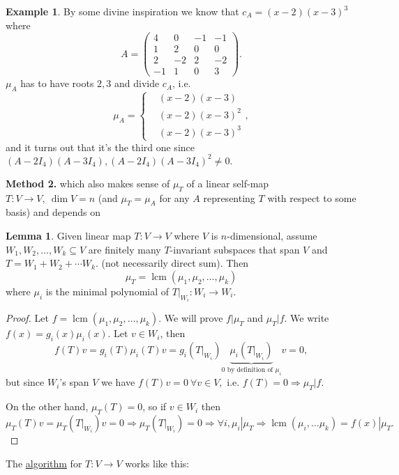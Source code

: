 \documentclass[a4paper]{article}
\newcommand{\lcm}{\operatorname{lcm}}
\theoremstyle{definition}
\newtheorem{lemma}[defn]{Lemma}
\newtheorem{example}[defn]{Example}
\begin{document}
\begin{example}
	By some divine inspiration we know that $c_{A}=(x-2)(x-3)^3$ where
\[
A=\begin{pmatrix}
		4 & 0 & -1 & -1 \\ 1 & 2 & 0 & 0 \\ 2 & -2 & 2 & -2 \\ -1 & 1 & 0 & 3
	\end{pmatrix} .
\]
$\mu_{A}$ has to have roots $2,3$ and divide $c_{A}$, i.e.
\[
\mu_{A}=\left\{ \begin{aligned}
		&(x-2)(x-3) \\ &(x-2)(x-3)^2 \\ &(x-2)(x-3)^3
	\end{aligned} \right. ,
\]
and it turns out that it's the third one since $(A-2I_4)(A-3I_4),(A-2I_4)(A-3I_4)^2 \neq 0 .$
\end{example}

\textbf{Method 2.} which also makes sense of $\mu_T$ of a linear self-map $T:V\rightarrow V, \ \dim V=n$ (and $\mu_T=\mu_{A}$ for any $A$ representing $T$ with respect to some basis) and depends on
\begin{lemma}
	Given linear map $T:V\rightarrow V$ where $V$ is $n$-dimensional, assume $W_1,W_2,\ldots,W_k \subseteq V$ are finitely many $T$-invariant subspaces that span $V$ and $T=W_1+W_2+\cdots W_k .$ (not necessarily direct sum). Then
\[
\mu_T=\lcm (\mu_1,\mu_2,\ldots,\mu_k)
\]
where $\mu_i$ is the minimal polynomial of $\left. T \right|_{W_i}: W_i \rightarrow W_i$.
\end{lemma}

\begin{proof}
	Let $f=\lcm (\mu_1,\mu_2,\ldots,\mu_k)$. We will prove $f|\mu_T$ and $\mu_T|f$. We write $f(x)=g_i(x)\mu_i(x)$. Let $v\in W_i$, then
\[
f(T)v=g_i(T)\mu_i(T)v=g_i\left(\left. T\right|_{W_i}\right)\underbrace{\mu_i \left(\left. T\right|_{W_i}\right)}_{0\text{ by definition of }\mu_i}v=0 ,
\]
but since $W_i$'s span $V$ we have $f(T)v=0 \ \forall v\in V ,$ i.e. $f(T)=0 \Rightarrow \mu_T |f$.

	On the other hand, $\mu_T(T)=0$, so if $v\in W_i$ then $\mu_T(T)v=\mu_T\left(\left.T\right|_{W_i}\right)v=0 \Rightarrow \mu_T\left(\left.T\right|_{W_i}\right)=0 \Rightarrow \forall i, \mu_i |\mu_T \Rightarrow \lcm (\mu_i,\ldots \mu_k)=f(x)|\mu_T .$
\end{proof}

The \underline{algorithm} for $T:V\rightarrow V$ works like this:
\end{document}
